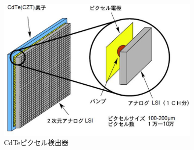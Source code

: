 \begin{figure}[H]
 \begin{center}
 \includegraphics[width=10cm]{image/other/CdTe_pixel.eps}
 \end{center}
 \caption{CdTeピクセル検出器\cite{takahashi}}
 \label{fig:pixel_CdTe}
\end{figure}

%
\fi


